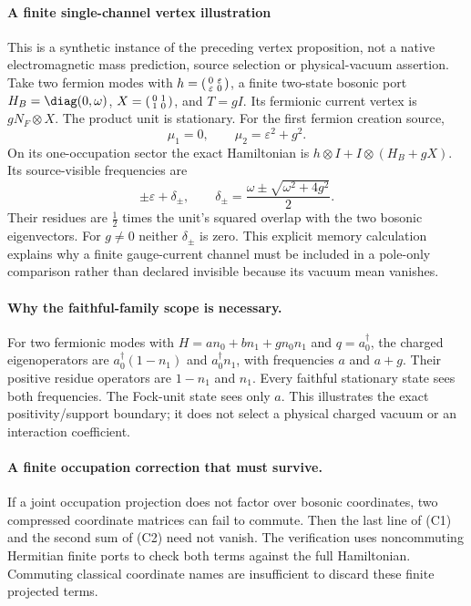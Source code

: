 \documentclass[12pt,a4paper]{article}
\begin{document}
\paragraph{A finite single-channel vertex illustration}
This is a synthetic instance of the preceding vertex proposition, not a
native electromagnetic mass prediction, source selection or physical-vacuum
assertion. Take two fermion modes with
$h=\begin{psmallmatrix}0&\varepsilon\\\varepsilon&0\end{psmallmatrix}$,
a finite two-state bosonic port
$H_B=\diag(0,\omega)$, $X=\begin{psmallmatrix}0&1\\1&0\end{psmallmatrix}$,
and $T=gI$. Its fermionic current vertex is $gN_F\otimes X$.
The product unit is stationary. For the first fermion creation source,
\[
 \mu_1=0,\qquad \mu_2=\varepsilon^2+g^2.
\]
On its one-occupation sector the exact Hamiltonian is
$h\otimes I+I\otimes(H_B+gX)$. Its source-visible frequencies are
\[
 \pm\varepsilon+\delta_\pm,\qquad
 \delta_\pm=\frac{\omega\pm\sqrt{\omega^2+4g^2}}2.
\]
Their residues are $\tfrac12$ times the unit's squared overlap with the two
bosonic eigenvectors. For $g\ne0$ neither $\delta_\pm$ is zero. This explicit
memory calculation explains why a finite gauge-current channel must be
included in a pole-only comparison rather than declared invisible because
its vacuum mean vanishes.

\paragraph{Why the faithful-family scope is necessary.}
For two fermionic modes with
$H=a n_0+b n_1+g n_0n_1$ and $q=a_0^\dagger$, the charged eigenoperators
are $a_0^\dagger(1-n_1)$ and $a_0^\dagger n_1$, with frequencies $a$ and
$a+g$. Their positive residue operators are $1-n_1$ and $n_1$.
Every faithful stationary state sees both frequencies. The Fock-unit state
sees only $a$. This illustrates the exact positivity/support boundary; it
does not select a physical charged vacuum or an interaction coefficient.

\paragraph{A finite occupation correction that must survive.}
If a joint occupation projection does not factor over bosonic coordinates,
two compressed coordinate matrices can fail to commute. Then the last
line of (C1) and the second sum of (C2) need not vanish. The verification
uses noncommuting Hermitian finite ports to check both terms against the
full Hamiltonian. Commuting classical coordinate names are insufficient
to discard these finite projected terms.
\end{document}
